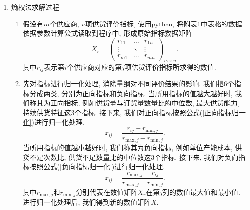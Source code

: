 \documentclass[11pt, fontset = windows]{article}
\begin{document}
\begin{enumerate}

    \item 熵权法求解过程

          \begin{enumerate}

              \item 假设有$m$个供应商, $n$项供货评价指标, 使用python, 将附表1中表格的数据依据参数计算公式读取到程序中, 形成原始指标数据矩阵
                    \begin{equation}
                        X_r = \begin{pmatrix}
                            r_{11} & \dots  & r_{1n} \\
                            \vdots & \ddots & \vdots \\
                            r_{m1} & \dots  & r_{mn}
                        \end{pmatrix}_{m\times n}.
                    \end{equation}
                    其中$r_{ij}$表示第$i$个供应商对应的第$j$项供货评价指标所求得的数值.

              \item 先对指标进行归一化处理, 消除量纲对不同评价结果的影响. 我们把6个指标分成两类, 分别为正向指标和负向指标.
                    当所用指标的值越大越好时, 我们称其为正向指标, 例如供货量与订货量数量比的中位数, 最大供货能力, 持续供货特征这3个指标.
                    接下来, 我们对正向指标按照公式(\ref{正向指标归一化})进行归一化处理.
                    \begin{equation}
                        \label{正向指标归一化}
                        x_{ij}=\frac{r_{ij}-r_{\mathrm{min},j}}{r_{\mathrm{max},j}-r_{\mathrm{min},j}}.
                    \end{equation}
                    当所用指标的值越小越好时, 我们称其为负向指标, 例如单位产能成本, 供货不足次数比, 供货不足数量比的中位数这3个指标.
                    接下来, 我们对负向指标按照公式(\ref{负向指标归一化})进行归一化处理.
                    \begin{equation}
                        \label{负向指标归一化}
                        x_{ij}=\frac{r_{\mathrm{max},j}-r_{ij}}{r_{\mathrm{max},j}-r_{\mathrm{min},j}}.
                    \end{equation}
                    其中$r_{\mathrm{max},j}$和$r_{\mathrm{min},j}$分别代表在数值矩阵$X_r$在第$j$列的数值最大值和最小值. 进行归一化处理后, 我们得到新的数值矩阵$X$.


\end{enumerate}
\end{enumerate}
\end{document}
